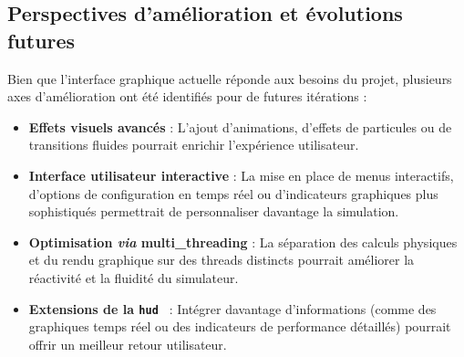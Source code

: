 \subsection{Perspectives d'amélioration et évolutions futures}\label{subsec:perspectives-d-evolution}
Bien que l'interface graphique actuelle réponde aux besoins du projet, plusieurs axes d'amélioration ont été identifiés pour de futures itérations :
\begin{itemize}
    \item \textbf{Effets visuels avancés} : L'ajout d'animations, d'effets de particules ou de transitions fluides pourrait enrichir l'expérience utilisateur.
    \item \textbf{Interface utilisateur interactive} : La mise en place de menus interactifs, d'options de configuration en temps réel ou d'indicateurs graphiques plus sophistiqués permettrait de personnaliser davantage la simulation.
    \item \textbf{Optimisation \textit{via} \gls{multi_threading}} : La séparation des calculs physiques et du rendu graphique sur des threads distincts pourrait améliorer la réactivité et la fluidité du simulateur.
    \item \textbf{Extensions de la \texttt{\gls{hud} }} : Intégrer davantage d'informations (comme des graphiques temps réel ou des indicateurs de performance détaillés) pourrait offrir un meilleur retour utilisateur.
\end{itemize}
